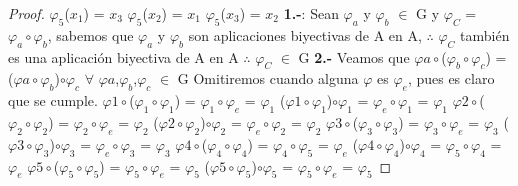 \documentclass[10pt,a4paper,oneside]{article}
\begin{document}
\begin{proof}
				\newline
				$\varphi_{5}$($x_{1}$) = $x_{3}$
				\newline
				$\varphi_{5}$($x_{2}$) = $x_{1}$
				\newline
				$\varphi_{5}$($x_{3}$) = $x_{2}$
				\newline
				\newline
				\textbf{1.-}:
				Sean $\varphi_{a}$ y  $\varphi_{b}$ $\in$ G y $\varphi_{C}$ = $\varphi_{a}\circ\varphi_{b}$, sabemos que $\varphi_{a}$ y $\varphi_{b}$ son aplicaciones biyectivas de A en A, $\therefore$ $\varphi_{C}$ también es una aplicación biyectiva de A en A $\therefore$ $\varphi_{C}$ $\in$ G
				\newline
				\newline
				\textbf{2.-}
				Veamos que $\varphi{a}\circ$($\varphi_{b}\circ\varphi_{c}$) = ($\varphi{a}\circ\varphi_{b}$)$\circ\varphi_{c}$ $\forall$ $\varphi{a}$,$\varphi_{b}$,$\varphi_{c}$ $\in$ G
				\newline
				Omitiremos cuando alguna $\varphi$ es $\varphi_{e}$, pues es claro que se cumple.
				\newline
				$\varphi{1}\circ$($\varphi_{1}\circ\varphi_{1}$) = $\varphi_{1}\circ\varphi_{e}$ = $\varphi_{1}$
				\newline
				($\varphi{1}\circ\varphi_{1}$)$\circ\varphi_{1}$ = $\varphi_{e}\circ\varphi_{1}$ = $\varphi_{1}$
				\newline
				$\varphi{2}\circ$($\varphi_{2}\circ\varphi_{2}$) = $\varphi_{2}\circ\varphi_{e}$ = $\varphi_{2}$
				\newline
				($\varphi{2}\circ\varphi_{2}$)$\circ\varphi_{2}$ = $\varphi_{e}\circ\varphi_{2}$ = $\varphi_{2}$
				\newline
				$\varphi{3}\circ$($\varphi_{3}\circ\varphi_{3}$) = $\varphi_{3}\circ\varphi_{e}$ = $\varphi_{3}$
				\newline
				($\varphi{3}\circ\varphi_{3}$)$\circ\varphi_{3}$ = $\varphi_{e}\circ\varphi_{3}$ = $\varphi_{3}$
				\newline
				$\varphi{4}\circ$($\varphi_{4}\circ\varphi_{4}$) = $\varphi_{4}\circ\varphi_{5}$ = $\varphi_{e}$
				\newline
				($\varphi{4}\circ\varphi_{4}$)$\circ\varphi_{4}$ = $\varphi_{5}\circ\varphi_{4}$ = $\varphi_{e}$
				\newline
				$\varphi{5}\circ$($\varphi_{5}\circ\varphi_{5}$) = $\varphi_{5}\circ\varphi_{e}$ = $\varphi_{5}$
				\newline
				($\varphi{5}\circ\varphi_{5}$)$\circ\varphi_{5}$ = $\varphi_{5}\circ\varphi_{e}$ = $\varphi_{5}$

\end{proof}
\end{document}
